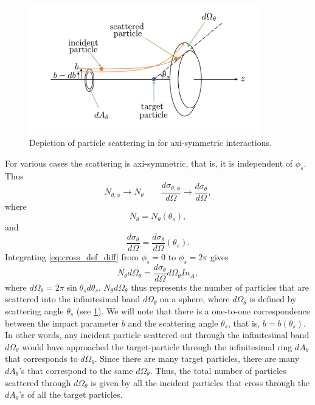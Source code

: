\documentclass[a4paper,11pt]{report}
\begin{document}
\begin{figure}[ht]
    \centering
    \includegraphics[width=10cm]{../../images/scattering_axi.pdf}
    \caption{Depiction of particle scattering in for axi-symmetric interactions.}
    \label{fig:scattering_axi}
\end{figure}
For various cases the scattering is axi-symmetric, that is, it is independent of $\phi_s$. Thus
\begin{equation*}
    N_{\theta, \phi} \to N_\theta \qquad \frac{d\sigma_{\theta,\phi}}{d\Omega} \to \frac{d\sigma_\theta}{d\Omega},
\end{equation*}
where 
\begin{equation*}
    N_\theta = N_\theta (\theta_s),
\end{equation*}
and
\begin{equation*}
    \frac{d\sigma_\theta}{d\Omega} = \frac{d\sigma_\theta}{d\Omega} (\theta_s).
\end{equation*}
Integrating \cref{eq:cross_def_diff} from $\phi_s = 0$ to $\phi_s = 2\pi$ gives
\begin{equation}
    \label{eq:cross_def_diff_axi}
    N_\theta d\Omega_\theta = \frac{d\sigma_\theta}{d\Omega} d\Omega_\theta I n_A,
\end{equation}
where $d \Omega_\theta = 2\pi \sin \theta_s d\theta_s$. $N_\theta d\Omega_\theta$ thus represents the number of particles that are scattered into the infinitesimal band $d\Omega_\theta$ on a sphere, where $d\Omega_\theta$ is defined by scattering angle $\theta_s$ (see \cref{fig:scattering_axi}). We will note that there is a one-to-one correspondence between the impact parameter $b$ and the scattering angle $\theta_s$, that is, $b = b(\theta_s)$. In other words, any incident particle scattered out through the infinitesimal band $d\Omega_\theta$ would have approached the target-particle through the infinitesimal ring $dA_\theta$ that corresponds to $d\Omega_\theta$. Since there are many target particles, there are many $dA_\theta$'s that correspond to the same $d\Omega_\theta$. Thus, the total number of particles scattered through $d\Omega_\theta$ is given by all the incident particles that cross through the $dA_\theta$'s of all the target particles.
\end{document}
